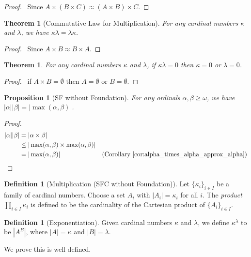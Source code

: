 \documentclass{book}
\let\qed\relax
\newtheorem{prop}[ax]{Proposition}
\newtheorem{thm}[ax]{Theorem}
\theoremstyle{definition}
\newtheorem{df}[ax]{Definition}
\begin{document}
\begin{proof}
\pf\ Since $A \times (B \times C) \approx (A \times B) \times C$. \qed
\end{proof}

\begin{thm}[Commutative Law for Multiplication]
For any cardinal numbers $\kappa$ and $\lambda$, we have $\kappa \lambda = \lambda \kappa$.
\end{thm}

\begin{proof}
\pf\ Since $A \times B \approx B \times A$. \qed
\end{proof}

\begin{thm}
For any cardinal numbers $\kappa$ and $\lambda$, if $\kappa \lambda = 0$ then $\kappa = 0$ or $\lambda = 0$.
\end{thm}

\begin{proof}
\pf\ if $A \times B = \emptyset$ then $A = \emptyset$ or $B = \emptyset$. \qed
\end{proof}

\begin{prop}[SF without Foundation]
For any ordinals $\alpha, \beta \geq \omega$, we have $|\alpha||\beta| = |\max(\alpha, \beta)|$.
\end{prop}

\begin{proof}
\pf
\begin{align*}
|\alpha||\beta| & = |\alpha \times \beta| \\
& \leq |\max(\alpha,\beta) \times \max(\alpha, \beta)| \\
& = |\max(\alpha, \beta)| & (\text{Corollary \ref{cor:alpha_times_alpha_approx_alpha}}) \qed
\end{align*}
\end{proof}

\begin{df}[Multiplication (SFC without Foundation)]
Let $\{ \kappa_i \}_{i \in I}$ be a family of cardinal numbers. Choose a set $A_i$ with $|A_i| = \kappa_i$ for all $i$. The \emph{product} $\prod_{i \in I} \kappa_i$ is defined to be the cardinality of the Cartesian product of $\{A_i\}_{i \in I}$.
\end{df}

\begin{df}[Exponentiation]
Given cardinal numbers $\kappa$ and $\lambda$, we define $\kappa^\lambda$ to be $|A^B|$, where $|A| = \kappa$ and $|B| = \lambda$.

We prove this is well-defined.
\end{df}
\end{document}
